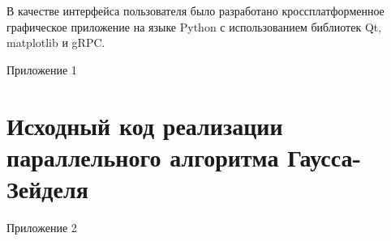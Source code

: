 \documentclass[a4paper,14pt,indentfirst]{extreport}
\begin{document}
В качестве интерфейса пользователя было разработано кроссплатформенное графическое приложение на языке Python с использованием библиотек Qt, matplotlib и gRPC.
\newpage
\printbibliography[title={СПИСОК ИСПОЛЬЗОВАННОЙ ЛИТЕРАТУРЫ}]
\newpage
\begin{flushright}
  Приложение 1
\end{flushright}
\chapter*{Исходный код реализации параллельного алгоритма Гаусса-Зейделя}

\newpage
\begin{flushright}
  Приложение 2
\end{flushright}
\end{document}

